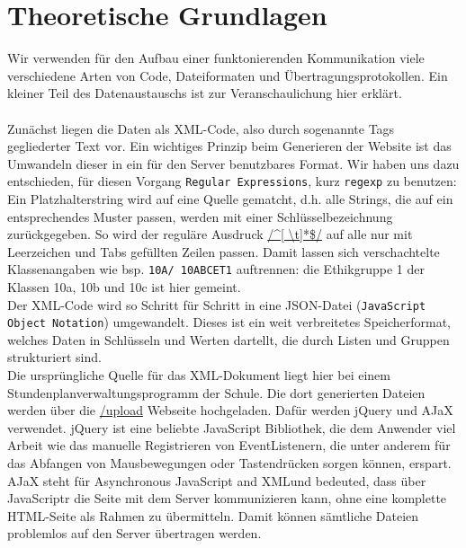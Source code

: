 \chapter{Theoretische Grundlagen}
Wir verwenden für den Aufbau einer funktonierenden Kommunikation viele verschiedene Arten von Code, Dateiformaten und Übertragungsprotokollen. Ein kleiner Teil des Datenaustauschs ist zur Veranschaulichung hier erklärt.\\\\



Zunächst liegen die Daten als XML-Code, also durch sogenannte Tags gegliederter Text vor. Ein wichtiges Prinzip beim Generieren der Website ist das Umwandeln dieser in ein für den Server benutzbares Format. Wir haben uns dazu entschieden, für diesen Vorgang \texttt{Regular Expressions}, kurz \texttt{regexp} zu benutzen: Ein Platzhalterstring wird auf eine Quelle \glqq gematcht\grqq , d.h. alle Strings, die auf ein entsprechendes Muster passen, werden mit einer Schlüsselbezeichnung zurückgegeben. So wird der reguläre Ausdruck \url{/^[ \t]*\$/} auf alle nur mit Leerzeichen und Tabs gefüllten Zeilen passen. Damit lassen sich verschachtelte Klassenangaben wie bsp. \texttt{10A/ 10ABCET1} auftrennen: die Ethikgruppe 1 der Klassen 10a, 10b und 10c ist hier gemeint.\\

Der XML-Code wird so Schritt für Schritt in eine JSON-Datei (\texttt{JavaScript Object Notation}) umgewandelt. Dieses ist ein weit verbreitetes Speicherformat, welches Daten in Schlüsseln und Werten dartellt, die durch Listen und Gruppen strukturiert sind.\\

Die ursprüngliche Quelle für das XML-Dokument liegt hier bei einem Stundenplanverwaltungsprogramm der Schule. Die dort generierten Dateien werden über die \url{/upload} Webseite hochgeladen. Dafür werden jQuery und AJaX verwendet. jQuery ist eine beliebte JavaScript Bibliothek, die dem Anwender viel Arbeit wie das manuelle Registrieren von EventListenern, die unter anderem für das Abfangen von Mausbewegungen oder Tastendrücken sorgen können, erspart. AJaX steht für \glqq Asynchronous JavaScript and XML\grqq und bedeuted, dass über JavaScriptr die Seite mit dem Server kommunizieren kann, ohne eine komplette HTML-Seite als Rahmen zu übermitteln. Damit können sämtliche Dateien problemlos auf den Server übertragen werden.\\

